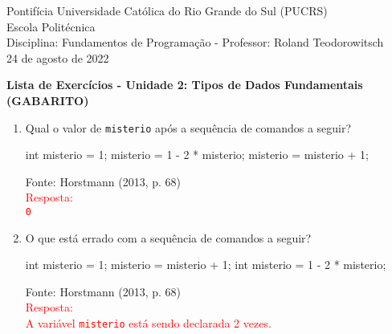 \documentclass[onecolumn,a4paper,10pt]{report}
\newcommand{\+}{\, + \,}
\newcommand{\<}{\hspace*{-0.4cm}}
\begin{document}
\singlespacing

\begin{center}
Pontifícia Universidade Católica do Rio Grande do Sul (PUCRS)\\
Escola Politécnica\\
Disciplina: Fundamentos de Programação - Professor: Roland Teodorowitsch\\
24 de agosto de 2022
\end{center}

\begin{center}
\textbf{Lista de Exercícios - Unidade 2: Tipos de Dados Fundamentais\\(GABARITO)}
\end{center}

\begin{enumerate}[1.]

\item Qual o valor de \texttt{misterio} após a sequência de comandos a seguir?\\
\begin{javacode}
int misterio = 1;
misterio = 1 - 2 * misterio;
misterio = misterio + 1;
\end{javacode}
{\tiny Fonte: Horstmann (2013, p. 68)}\\
\textcolor{red}{Resposta:\\
\texttt{0}
}

\item O que está errado com a sequência de comandos a seguir?\\
\begin{javacode}
int misterio = 1;
misterio = misterio + 1;
int misterio = 1 - 2 * misterio;
\end{javacode}
{\tiny Fonte: Horstmann (2013, p. 68)}\\
\textcolor{red}{Resposta:\\
A variável \texttt{misterio} está sendo declarada 2 vezes.
}


\end{enumerate}
\end{document}
